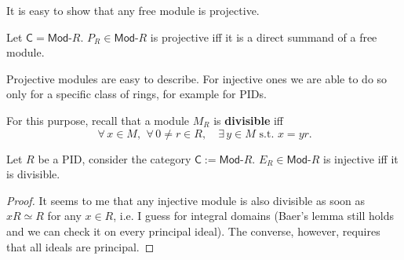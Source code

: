 \begin{rem}
	It is easy to show that any free module is projective.
\end{rem}

\begin{prop}
	Let $\mathsf{C} = \mathsf{Mod}\text{-}R$.
	$P_R \in \mathsf{Mod}\text{-}R$ is projective iff 
	it is a direct summand of a free module.
\end{prop} 

\begin{rem}
	Projective modules are easy to describe.
	For injective ones we are able to do so only for a specific class of rings, for example for PIDs.

	For this purpose, recall that a module $M_R$ is \textbf{divisible} iff
	\begin{equation}
	\,\forall\, x \in M, \ \,\forall\, 0 \neq r \in R, \quad \exists\, y \in M \text{ s.t. } x = yr
	.\end{equation} 
\end{rem}

\begin{prop}
	Let $R$ be a PID, consider the category $\mathsf{C} := \mathsf{Mod}\text{-}R$.
	$E_R \in \mathsf{Mod}\text{-}R$ is injective iff it is divisible.
\end{prop} 
\begin{proof}
	It seems to me that any injective module is also divisible
	as soon as $xR \simeq R$ for any $x \in R$, i.e. I guess for integral domains
	(Baer's lemma still holds and we can check it on every principal ideal).
	The converse, however, requires that all ideals are principal.
\end{proof}


